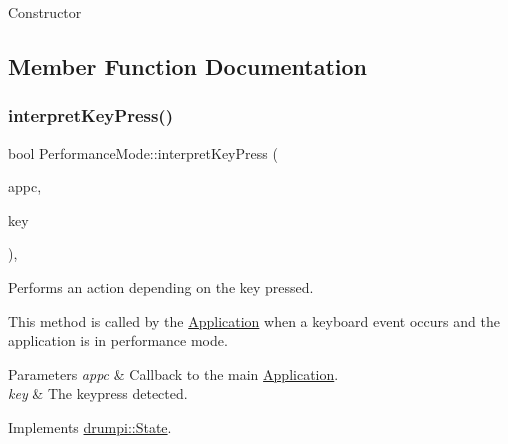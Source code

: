Constructor 

\subsection{Member Function Documentation}
\mbox{\label{classdrumpi_1_1PerformanceMode_a37c7c2eed9185a2211e389eebfd60262}} 
\subsubsection{\texorpdfstring{interpret\+Key\+Press()}{interpretKeyPress()}}
{\footnotesize\ttfamily bool Performance\+Mode\+::interpret\+Key\+Press (\begin{DoxyParamCaption}\item[{\hyperlink{classdrumpi_1_1ApplicationCallback}{Application\+Callback} $\ast$}]{appc,  }\item[{int}]{key }\end{DoxyParamCaption})\hspace{0.3cm}{\ttfamily [override]}, {\ttfamily [virtual]}}



Performs an action depending on the key pressed. 

This method is called by the \hyperlink{classdrumpi_1_1Application}{Application} when a keyboard event occurs and the application is in performance mode. 
\begin{DoxyParams}{Parameters}
{\em appc} & Callback to the main \hyperlink{classdrumpi_1_1Application}{Application}. \\
\hline
{\em key} & The keypress detected. \\
\hline
\end{DoxyParams}


Implements \hyperlink{classdrumpi_1_1State_aaa6205d85513b3f717c126e0717e1dbd}{drumpi\+::\+State}.

\mbox{\label{classdrumpi_1_1PerformanceMode_afc7bfd820bb21e4003ffe9ef189fa290}} 
